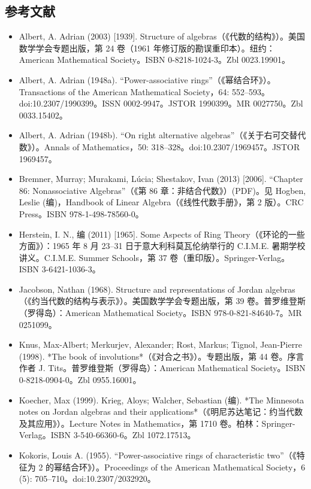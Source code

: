 \subsection{参考文献}
\begin{itemize}
\item Albert, A. Adrian (2003) [1939]. Structure of algebras（《代数的结构》）。美国数学学会专题出版，第 24 卷（1961 年修订版的勘误重印本）。纽约：American Mathematical Society。ISBN 0-8218-1024-3。Zbl 0023.19901。
\item Albert, A. Adrian (1948a). “Power-associative rings”（《幂结合环》）。Transactions of the American Mathematical Society，64: 552–593。doi:10.2307/1990399。ISSN 0002-9947。JSTOR 1990399。MR 0027750。Zbl 0033.15402。
\item Albert, A. Adrian (1948b). “On right alternative algebras”（《关于右可交替代数》）。Annals of Mathematics，50: 318–328。doi:10.2307/1969457。JSTOR 1969457。
\item Bremner, Murray; Murakami, Lúcia; Shestakov, Ivan (2013) [2006]. “Chapter 86: Nonassociative Algebras”（《第 86 章：非结合代数》）(PDF)。见 Hogben, Leslie (编)，Handbook of Linear Algebra（《线性代数手册》，第 2 版）。CRC Press。ISBN 978-1-498-78560-0。
\item Herstein, I. N., 编 (2011) [1965]. Some Aspects of Ring Theory（《环论的一些方面》）：1965 年 8 月 23–31 日于意大利科莫瓦伦纳举行的 C.I.M.E. 暑期学校讲义。C.I.M.E. Summer Schools，第 37 卷（重印版）。Springer-Verlag。ISBN 3-6421-1036-3。
\item Jacobson, Nathan (1968). Structure and representations of Jordan algebras（《约当代数的结构与表示》）。美国数学学会专题出版，第 39 卷。普罗维登斯（罗得岛）：American Mathematical Society。ISBN 978-0-821-84640-7。MR 0251099。
\item Knus, Max-Albert; Merkurjev, Alexander; Rost, Markus; Tignol, Jean-Pierre (1998). *The book of involutions*（《对合之书》）。专题出版，第 44 卷。序言作者 J. Tits。普罗维登斯（罗得岛）：American Mathematical Society。ISBN 0-8218-0904-0。Zbl 0955.16001。
\item Koecher, Max (1999). Krieg, Aloys; Walcher, Sebastian (编). *The Minnesota notes on Jordan algebras and their applications*（《明尼苏达笔记：约当代数及其应用》）。Lecture Notes in Mathematics，第 1710 卷。柏林：Springer-Verlag。ISBN 3-540-66360-6。Zbl 1072.17513。
\item Kokoris, Louis A. (1955). “Power-associative rings of characteristic two”（《特征为 2 的幂结合环》）。Proceedings of the American Mathematical Society，6 (5): 705–710。doi:10.2307/2032920。

\end{itemize}
